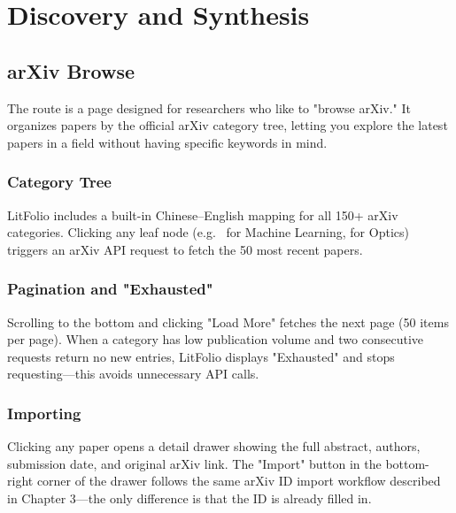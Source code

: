 \part{Discovery and Synthesis}

\chapter{arXiv Browse}
\label{ch:browse}

The  route is a page designed for researchers who like to "browse arXiv." It organizes
papers by the official arXiv category tree, letting you explore the latest papers in a field without
having specific keywords in mind.

\section{Category Tree}


LitFolio includes a built-in Chinese--English mapping for all 150+ arXiv categories. Clicking any
leaf node (e.g.\  for Machine Learning,  for Optics) triggers an
arXiv API request to fetch the 50 most recent papers.

\section{Pagination and "Exhausted"}

Scrolling to the bottom and clicking "Load More" fetches the next page (50 items per page). When a
category has low publication volume and two consecutive requests return no new entries, LitFolio
displays "Exhausted" and stops requesting---this avoids unnecessary API calls.

\section{Importing}

Clicking any paper opens a detail drawer showing the full abstract, authors, submission date, and
original arXiv link. The "Import" button in the bottom-right corner of the drawer follows the same
arXiv ID import workflow described in Chapter 3---the only difference is that the ID is already
filled in.


